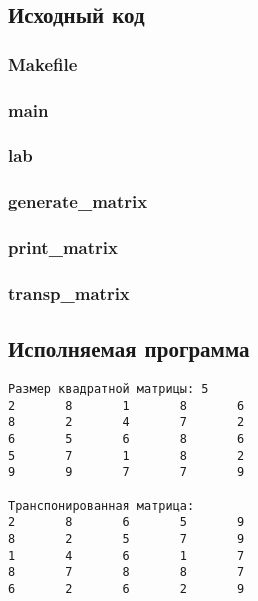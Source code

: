 \documentclass[12pt, a4paper]{article}
\begin{document}
\subsection{Исходный код}

\subsubsection{Makefile}


\subsubsection{main}



\subsubsection{lab}



\subsubsection{generate\_matrix}



\subsubsection{print\_matrix}



\subsubsection{transp\_matrix}



\subsection{Исполняемая программа}

\begin{verbatim}
Размер квадратной матрицы: 5
2       8       1       8       6
8       2       4       7       2
6       5       6       8       6
5       7       1       8       2
9       9       7       7       9

Транспонированная матрица:
2       8       6       5       9
8       2       5       7       9
1       4       6       1       7
8       7       8       8       7
6       2       6       2       9
\end{verbatim}
\end{document}

